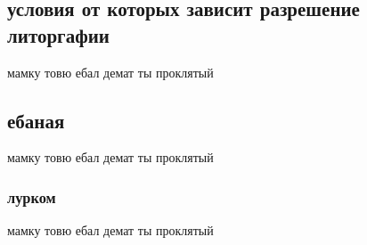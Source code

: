
\begin{titlepage}

\begin{center}

\chapter{условия от которых зависит разрешение литоргафии}%
мамку товю ебал демат ты проклятый
\section{ебаная}
мамку товю ебал демат ты проклятый
\subsection{лурком}
мамку товю ебал демат ты проклятый
\end{center}

\end{titlepage}
 

